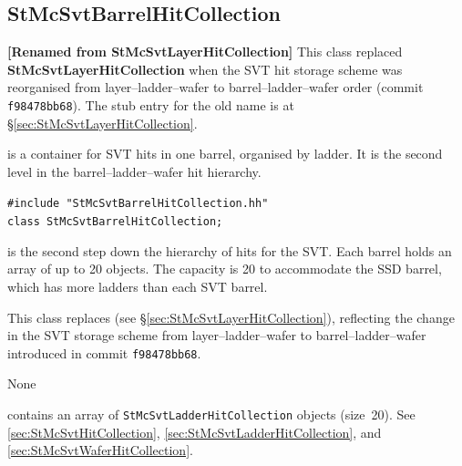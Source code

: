 \subsection{StMcSvtBarrelHitCollection}
 
\label{sec:StMcSvtBarrelHitCollection}
\textbf{[Renamed from StMcSvtLayerHitCollection]}
This class replaced \textbf{StMcSvtLayerHitCollection} when the SVT hit
storage scheme was reorganised from layer--ladder--wafer to
barrel--ladder--wafer order (commit \texttt{f98478bb68}).
The stub entry for the old name is at \S\ref{sec:StMcSvtLayerHitCollection}.
\begin{Entry}
\item[Summary]
     is a container for SVT hits in one
    barrel, organised by ladder.  It is the second level in the
    barrel--ladder--wafer hit hierarchy.

\item[Synopsis]
    \verb+#include "StMcSvtBarrelHitCollection.hh"+\\
    \verb+class StMcSvtBarrelHitCollection;+\\

\item[Description]
     is the second step down the
    hierarchy of hits for the SVT.  Each barrel holds an array of up to 20
     objects.  The capacity is 20 to
    accommodate the SSD barrel, which has more ladders than each SVT barrel.

    This class replaces 
    (see \S\ref{sec:StMcSvtLayerHitCollection}), reflecting the change in
    the SVT storage scheme from layer--ladder--wafer to
    barrel--ladder--wafer introduced in commit \texttt{f98478bb68}.

\item[Persistence]
    None

\item[Related Classes]
     contains an array of
    {\tt StMcSvtLadderHitCollection} objects (size~20).  See
     \ref{sec:StMcSvtHitCollection},
     \ref{sec:StMcSvtLadderHitCollection},
    and  \ref{sec:StMcSvtWaferHitCollection}.


\end{Entry}
